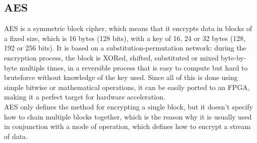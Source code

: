 \documentclass[12pt,oneside,a4paper]{article}
\begin{document}
\subsection{AES} \label{subsec:aes}
AES \cite{aes:specification} is a symmetric block cipher, which means that it encrypts data in blocks of a fixed size, which is 16 bytes (128 bits), with a key of 16, 24 or 32 bytes (128, 192 or 256 bits).
It is based on a substitution-permutation network: during the encryption process, the block is XORed, shifted, substituted or mixed byte-by-byte multiple times, in a reversible process that is easy to compute but hard to bruteforce without knowledge of the key used.
Since all of this is done using simple bitwise or mathematical operations, it can be easily ported to an FPGA, making it a perfect target for hardware acceleration.
\\AES only defines the method for encrypting a single block, but it doesn't specify how to chain multiple blocks together, which is the reason why it is usually used in conjunction with a mode of operation, which defines how to encrypt a stream of data.
\end{document}
